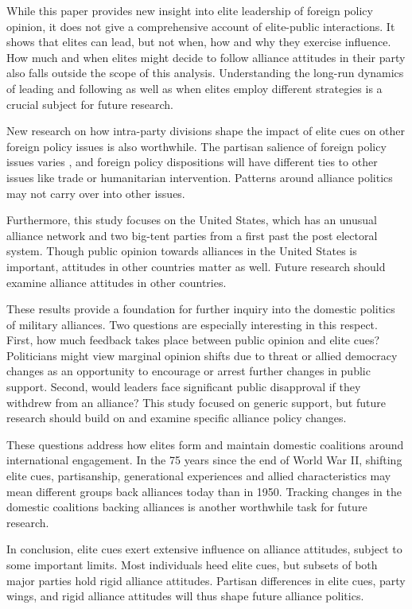\documentclass[12pt]{article}
\begin{document}
While this paper provides new insight into elite leadership of foreign policy opinion, it does not give a comprehensive account of elite-public interactions.
It shows that elites can lead, but not when, how and why they exercise influence. 
How much and when elites might decide to follow alliance attitudes in their party also falls outside the scope of this analysis. 
Understanding the long-run dynamics of leading and following as well as when elites employ different strategies is a crucial subject for future research. 


New research on how intra-party divisions shape the impact of elite cues on other foreign policy issues is also worthwhile. 
The partisan salience of foreign policy issues varies \citep{GuisingerSaunders2017}, and foreign policy dispositions will have different ties to other issues like trade or humanitarian intervention.
Patterns around alliance politics may not carry over into other issues.


Furthermore, this study focuses on the United States, which has an unusual alliance network and two big-tent parties from a first past the post electoral system. 
Though public opinion towards alliances in the United States is important, attitudes in other countries matter as well. 
Future research should examine alliance attitudes in other countries. 


These results provide a foundation for further inquiry into the domestic politics of military alliances. 
Two questions are especially interesting in this respect.
First, how much feedback takes place between public opinion and elite cues? 
Politicians might view marginal opinion shifts due to threat or allied democracy changes as an opportunity to encourage or arrest further changes in public support.
Second, would leaders face significant public disapproval if they withdrew from an alliance? 
This study focused on generic support, but future research should build on \citet{TomzWeeks2021} and examine specific alliance policy changes. 


These questions address how elites form and maintain domestic coalitions around international engagement. 
In the 75 years since the end of World War II, shifting elite cues, partisanship, generational experiences and allied characteristics may mean different groups back alliances today than in 1950. 
Tracking changes in the domestic coalitions backing alliances is another worthwhile task for future research.


In conclusion, elite cues exert extensive influence on alliance attitudes, subject to some important limits.
Most individuals heed elite cues, but subsets of both major parties hold rigid alliance attitudes. 
Partisan differences in elite cues, party wings, and rigid alliance attitudes will thus shape future alliance politics.



\newpage

 
 
\end{document}
